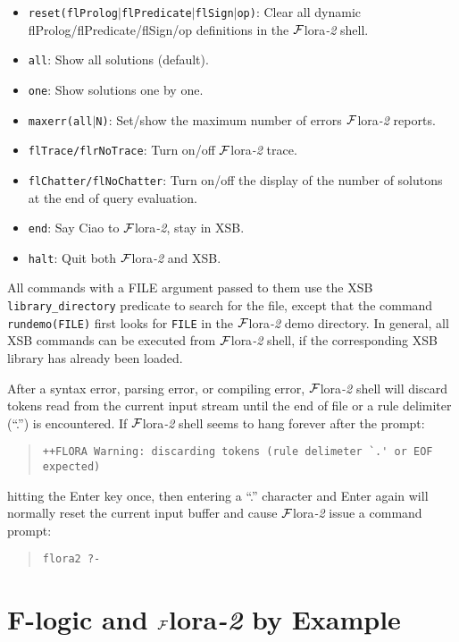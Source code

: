\documentclass[11pt]{article}
\newcommand{\FLORA}{{\mbox{${\cal F}${\sc lora}\rm\emph{-2}}}\xspace}
\newcommand{\fl}{\mbox{F-logic}\xspace}
\begin{document}
\begin{itemize}
\item {\tt reset(flProlog$|$flPredicate$|$flSign$|$op)}:
    Clear all dynamic flProlog/flPredicate/flSign/op definitions in the
    \FLORA shell.
\item {\tt all}:
    Show all solutions (default).
\item {\tt one}:
    Show solutions one by one.
\item {\tt maxerr(all$|$N)}:
    Set/show the maximum number of errors \FLORA reports.
\item {\tt flTrace/flrNoTrace}:
    Turn on/off \FLORA trace.
\item {\tt flChatter/flNoChatter}:
    Turn on/off the display of the number of solutons at the end of query
    evaluation.
\item {\tt end}:
    Say Ciao to \FLORA, stay in XSB.
\item {\tt halt}:
    Quit both \FLORA and XSB.
\end{itemize}

All commands with a FILE argument passed to them use the XSB
{\tt library\_directory} predicate to search for the file, except that the
command {\tt rundemo(FILE)} first looks for {\tt FILE} in the \FLORA demo
directory. In general, all XSB commands can be executed from \FLORA shell,
if the corresponding XSB library has already been loaded.

After a syntax error, parsing error, or compiling error, \FLORA shell will
discard tokens read from the current input stream until the end of file or a
rule delimiter (``.'') is encountered. If \FLORA shell seems to hang forever
after the prompt:
\begin{quote}
\begin{verbatim}
++FLORA Warning: discarding tokens (rule delimeter `.' or EOF expected)
\end{verbatim}
\end{quote}
hitting the Enter key once, then entering a ``.'' character and Enter again
will normally reset the current input buffer and cause \FLORA issue a
command prompt:
\begin{quote}
\begin{verbatim}
flora2 ?-
\end{verbatim}
\end{quote}

 
\section{\fl and \FLORA by Example}
\end{document}
